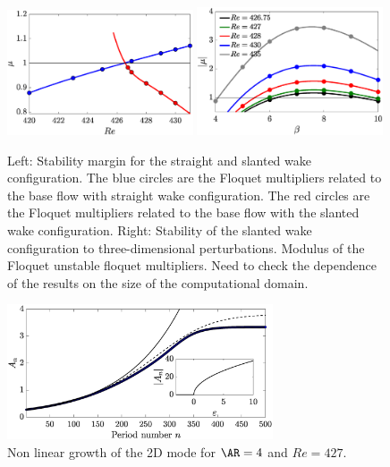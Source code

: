 \begin{figure}
\centering
\includegraphics[width=0.49\textwidth]{./fig/AR4_2Dbif_multipliers.eps}
\includegraphics[width=0.49\textwidth]{./fig/AR4_3Dbif_multipliers.eps}
\caption{Left: Stability margin for the straight and slanted wake configuration. The blue circles are the Floquet multipliers related to the base flow with straight wake configuration. The red circles are the Floquet multipliers related to the base flow with the slanted wake configuration. Right: Stability of the slanted wake configuration to three-dimensional perturbations. Modulus of the Floquet unstable floquet multipliers. {\color{red} Need to check the dependence of the results on the size of the computational domain}.}
\label{fig:2Dmultipliers}
\end{figure}


\begin{figure}
  \centering
  \includegraphics[width=0.7\textwidth]{./fig/AR4/Nlgrowth_Re427.eps}
  \caption{Non linear growth of the 2D mode for $\AR=4$ and $Re=427$.}
  \label{fig:nl_AR4_Re427}
\end{figure}

